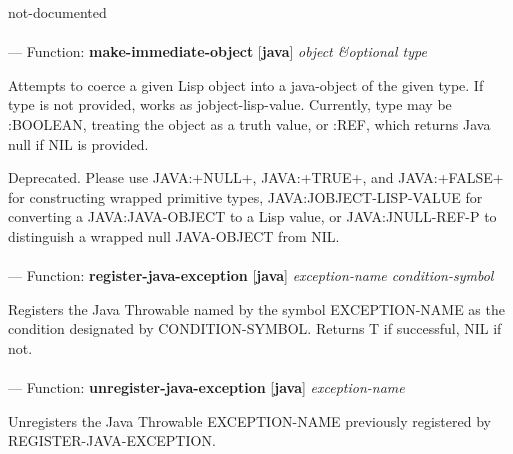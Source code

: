 \begin{adjustwidth}{5em}{5em}
not-documented
\end{adjustwidth}

\paragraph{}
\label{JAVA:MAKE-IMMEDIATE-OBJECT}
--- Function: \textbf{make-immediate-object} [\textbf{java}] \textit{object \&optional type}

\begin{adjustwidth}{5em}{5em}
Attempts to coerce a given Lisp object into a java-object of the
given type.  If type is not provided, works as jobject-lisp-value.
Currently, type may be :BOOLEAN, treating the object as a truth value,
or :REF, which returns Java null if NIL is provided.

Deprecated.  Please use JAVA:+NULL+, JAVA:+TRUE+, and JAVA:+FALSE+ for
constructing wrapped primitive types, JAVA:JOBJECT-LISP-VALUE for converting a
JAVA:JAVA-OBJECT to a Lisp value, or JAVA:JNULL-REF-P to distinguish a wrapped
null JAVA-OBJECT from NIL.
\end{adjustwidth}

\paragraph{}
\label{JAVA:REGISTER-JAVA-EXCEPTION}
--- Function: \textbf{register-java-exception} [\textbf{java}] \textit{exception-name condition-symbol}

\begin{adjustwidth}{5em}{5em}
Registers the Java Throwable named by the symbol EXCEPTION-NAME as the condition designated by CONDITION-SYMBOL.  Returns T if successful, NIL if not.
\end{adjustwidth}

\paragraph{}
\label{JAVA:UNREGISTER-JAVA-EXCEPTION}
--- Function: \textbf{unregister-java-exception} [\textbf{java}] \textit{exception-name}

\begin{adjustwidth}{5em}{5em}
Unregisters the Java Throwable EXCEPTION-NAME previously registered by REGISTER-JAVA-EXCEPTION.
\end{adjustwidth}

